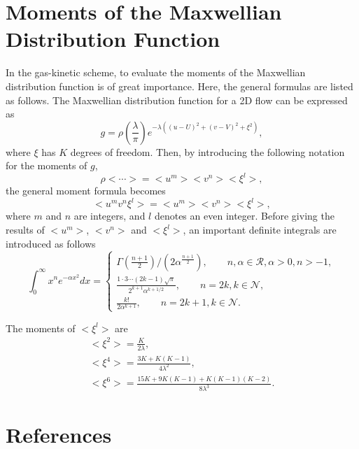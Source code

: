 \documentclass[review]{elsarticle}
\begin{document}
\section{Moments of the Maxwellian Distribution Function}
	In the gas-kinetic scheme, to evaluate the moments of the Maxwellian distribution function is of great importance.
	Here, the general formulas are listed as follows.
	The Maxwellian distribution function for a 2D flow can be expressed as 
	\begin{equation}\label{MaxwellianDistribution}
		g=\rho\left(\frac{\lambda}{\pi}\right)e^{-\lambda\left(\left(u-U\right)^2+\left(v-V\right)^2+\xi^2\right)},
	\end{equation}
	where $\xi$ has $K$ degrees of freedom. Then, by introducing the following notation for the moments of $g$,
	\begin{equation}\label{momNotation}
		\rho<\cdots>=<u^m><v^n><\xi^l>,
	\end{equation}
	the general moment formula becomes
	\begin{equation}\label{gMomNotation}
		<u^mv^n\xi^l>=<u^m><v^n><\xi^l>,
	\end{equation}
	where $m$ and $n$ are integers, and $l$ denotes an even integer. Before giving the results of $<u^m>$, $<v^n>$ and $<\xi^l>$,
	an important definite integrals are introduced as follows
	\begin{equation}\label{aInt}
		\int_{0}^{\infty}x^ne^{-\alpha x^2}dx=\left\{\begin{array}{c}
		\varGamma\left(\frac{n+1}{2}\right)/\left(2\alpha^{\frac{n+1}{2}}\right), \qquad n,\alpha \in \mathcal{R}, \alpha>0, n>-1,\\
		\frac{1 \cdot 3 \cdots \left(2k-1\right)\sqrt{\pi}}{2^{k+1}\alpha^{k+1/2}}, \qquad n=2k, k\in \mathcal{N},\\
		\frac{k!}{2\alpha^{k+1}}, \qquad n=2k+1, k\in \mathcal{N}.
		\end{array} \right.
	\end{equation}
	
	The moments of $<\xi^l>$ are
	\begin{equation}\label{momXi}
	\begin{gathered}
		<\xi^2>=\frac{K}{2\lambda},\\
		<\xi^4>=\frac{3K+K\left(K-1\right)}{4\lambda^2},\\
		<\xi^6>=\frac{15K+9K\left(K-1\right)+K\left(K-1\right)\left(K-2\right)}{8\lambda^3}.
	\end{gathered}
	\end{equation}
\section*{References}


\end{document}
